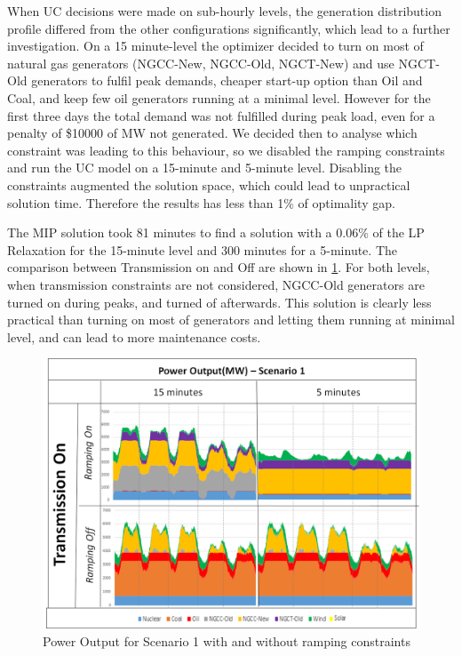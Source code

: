\documentclass[12pt,LUDisStyle,twosided]{book}
\begin{document}
When UC decisions were made on sub-hourly levels, the generation distribution profile differed from the other configurations significantly, which lead to a further investigation. On a 15 minute-level the optimizer decided to turn on most of natural gas generators (NGCC-New, NGCC-Old, NGCT-New) and use NGCT-Old generators to fulfil peak demands, cheaper start-up option than Oil and Coal, and keep few oil generators running at a minimal level. However for the first three days the total demand was not fulfilled during peak load, even for a penalty of \$10000 of MW not generated. We decided then to analyse which constraint was leading to this behaviour, so we disabled the ramping constraints and run the UC model on a 15-minute and 5-minute level. Disabling the constraints augmented the solution space, which could lead to unpractical solution time. Therefore the results has less than 1\% of optimality gap.

The MIP solution took 81 minutes to find a solution with a 0.06\% of the LP Relaxation for the 15-minute level and 300 minutes for a 5-minute. The comparison between Transmission on and Off are shown in \ref{fig:noRampingConstraint}. For both levels, when transmission constraints are not considered, NGCC-Old generators are turned on during peaks, and turned of afterwards. This solution is clearly less practical than turning on most of generators and letting them running at minimal level, and can lead to more maintenance costs.

\begin{figure}[h] 
	\begin{center}
		\includegraphics[width=\textwidth,keepaspectratio]{PowerOutputScenario1_NR.png}
	  	\caption{Power Output for Scenario 1 with and without ramping constraints}
     	\label{fig:noRampingConstraint}
	\end{center}
\end{figure}
\end{document}
